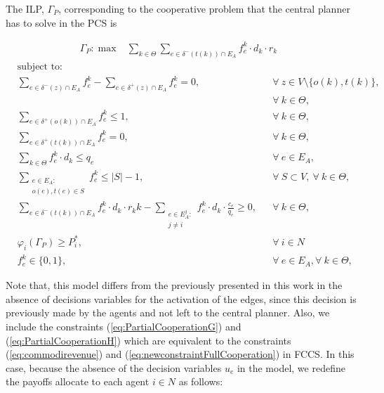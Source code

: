 \documentclass{article}
\begin{document}
The ILP, $\Gamma_P$, corresponding to the cooperative problem that the central planner has to solve in the PCS is

\begin{align}
        &  \Gamma_P: \max  & \sum_{k \in \Theta} \sum_{e \in \delta^-(t(k))\cap E_A}  f_e^k \cdot d_k \cdot r_k  &&   \label{eq:PartialCooperationA} 
    \end{align}
    \begin{align}
        & \text{subject to:}       && \nonumber\\
        & \sum_{e \in \delta^-(z)\cap E_A} f_e^k-\sum_{e \in \delta^+(z)\cap E_A} f_{e}^k = 0,            \quad && \forall\ z\in V\setminus\{o(k),t(k)\},\nonumber\\
& && \forall\ k\in\Theta,  \label{eq:PartialCooperationB}\\[1em]
& \sum_{e \in \delta^+(o(k))\cap E_A} f_e^k \leq 1,  && \forall\ k\in \Theta, \label{eq:PartialCooperationC} \\
& \sum_{e \in \delta^+(t(k))\cap E_A} f_e^k = 0,  && \forall\ k\in \Theta, \label{eq:PartialCooperationD} \\
 & \sum_{k \in \Theta} f_e^k\cdot d_k \leq q_e     && \forall\ e \in E_A, \label{eq:PartialCooperationE}  \\
 & \sum_{\substack{e \in E_A\colon \\ o(e),t(e) \in S}} f_e^k  \leq |S| -1,    && \forall\ S \subset V,\ \forall\ k \in \Theta, \label{eq:PartialCooperationF}\\
&\sum_{e \in \delta^-(t(k))\cap E_A}  f_e^k \cdot d_k \cdot r_kk
 -\sum_{\substack{e \in E_A^j\colon \\ j\not = i}} f_e^k \cdot d_k \cdot \frac{c_e}{q_e}\geq 0, && \forall\ k \in \Theta, \label{eq:PartialCooperationG} \\
& \varphi_i(\Gamma_P)   \geq P_i^*,     && \forall\ i\in N \label{eq:PartialCooperationH}\\
 & f_e^k  \in \{0,1\},    && \forall\ e \in E_A, \forall\ k \in \Theta, \label{eq:PartialCooperationI}
    \end{align}

Note that, this model differs from the previously presented in this work in the absence of decisions variables for the activation of the edges, since this decision is previously made by the agents and not left to the central planner. Also, we include the constraints (\ref{eq:PartialCooperationG}) and (\ref{eq:PartialCooperationH})
which are equivalent to the constraints (\ref{eq:commodirevenue}) and (\ref{eq:newconstraintFullCooperation}) in FCCS. In this case, because the absence of the decision variables $u_e$ in the model, we redefine the payoffs allocate to each agent $i\in N$ as follows:
\end{document}
